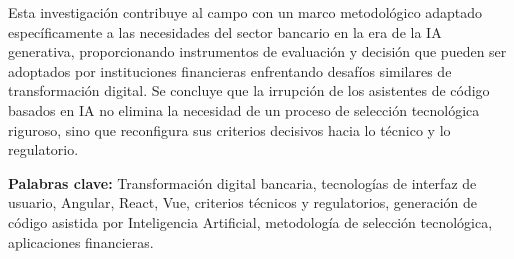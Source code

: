 Esta investigación contribuye al campo con un marco metodológico adaptado
específicamente a las necesidades del sector bancario en la era de la IA
generativa, proporcionando instrumentos de evaluación y decisión que pueden
ser adoptados por instituciones financieras enfrentando desafíos similares de
transformación digital. Se concluye que la irrupción de los asistentes de
código basados en IA no elimina la necesidad de un proceso de selección
tecnológica riguroso, sino que reconfigura sus criterios decisivos hacia lo
técnico y lo regulatorio.

\vspace{0.5cm}
\noindent \textbf{Palabras clave:} Transformación digital bancaria,
tecnologías de interfaz de usuario, Angular, React, Vue, criterios técnicos y
regulatorios, generación de código asistida por Inteligencia Artificial,
metodología de selección tecnológica, aplicaciones financieras.
